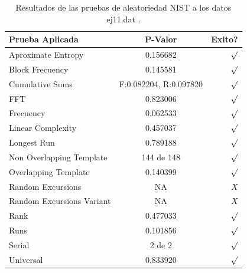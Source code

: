 \documentclass[10pt]{IEEEtran}
\begin{document}
\begin{table}[H]
\caption{Resultados de las pruebas de aleatoriedad NIST a los datos ej11.dat .}
\label{caso11}
\begin{center}
\begin{small}
\begin{tabular}{|l|c|r|}
\hline

Prueba Aplicada &  P-Valor & Exito? \\
\hline

Aproximate Entropy    &   0.156682  & $\surd$ \\

Block Frecuency  &  0.145581 &   $\surd$   \\

Cumulative Sums    &   F:0.082204, R:0.097820 & $\surd$ \\

FFT    &   0.823006 &  $\surd$     \\

Frecuency     &  0.062533  &  $\surd$   \\

Linear Complexity      & 0.457037 & $\surd$ \\

Longest Run      &  0.789188  &    $\surd$      \\

Non Overlapping Template      & 144 de 148    &     $\surd$          \\

Overlapping Template      &  0.140399  &      $\surd$      \\

Random Excursions      & NA  &    $X$      \\

Random Excursions Variant & NA &     $X$    \\

Rank & 0.477033  &      $\surd$      \\

Runs &    0.101856  &     $\surd$        \\

Serial &     2 de 2    &     $\surd$        \\

Universal &   0.833920  &   $\surd$            \\

\hline

\end{tabular}
\end{small}
\end{center}
\end{table}
\end{document}
